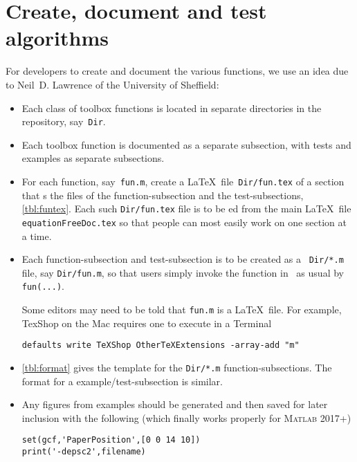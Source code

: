 \section{Create, document and test algorithms}
\label{sec:contribute}
\secttoc

For developers to create and document the various functions, we use an idea due to Neil~D. Lawrence of the University of Sheffield:

\begin{itemize}
\item Each class of toolbox functions is located in separate directories in the repository, say~\verb|Dir|.

\item Each toolbox function is documented as a separate subsection, with tests and examples as separate subsections.

\item For each function, say~\verb|fun.m|, create a \LaTeX\ file~\verb|Dir/fun.tex| of a section that \verb||s the  files of the function-subsection and the test-subsections, \autoref{tbl:funtex}.
Each such \verb|Dir/fun.tex| file is to be \verb||ed from the main \LaTeX\ file \verb|equationFreeDoc.tex| so that people can most easily work on one section at a time.  

\item Each function-subsection and test-subsection is to be created as a \script\ \verb|Dir/*.m| file, say \verb|Dir/fun.m|, so that users simply invoke the function in \script\ as usual by \verb|fun(...)|.

Some editors may need to be told that \verb|fun.m| is a \LaTeX\ file.  For example, TexShop on the Mac requires one to execute in a Terminal
\begin{verbatim}
defaults write TeXShop OtherTeXExtensions -array-add "m"
\end{verbatim}

\item \autoref{tbl:format} gives the template for the \verb|Dir/*.m| function-subsections.
The format for a example\slash test-subsection is similar.


\item Any figures from examples should be generated and then saved for later inclusion with the following (which finally works properly for \textsc{Matlab} 2017+)
\begin{verbatim}
set(gcf,'PaperPosition',[0 0 14 10])
print('-depsc2',filename)
\end{verbatim}

\end{itemize}



